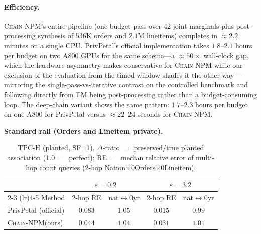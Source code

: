 \documentclass[sigconf, nonacm]{acmart}
\newcommand{\chainnpm}{\textsc{Chain-NPM}\xspace}
\begin{document}
\paragraph{Efficiency.}
\chainnpm's entire pipeline (one budget pass over $42$ joint marginals plus
post-processing synthesis of $536$K orders and $2.1$M lineitems) completes in
$\approx 2.2$ minutes on a single CPU. PrivPetal's official implementation
takes $1.8$--$2.1$ hours per budget on two A800 GPUs for the same schema---a
$\approx 50\times$ wall-clock gap, which the hardware asymmetry makes
conservative for \chainnpm{} while our exclusion of the evaluation from the
timed window shades it the other way---mirroring the single-pass-vs-iterative
contrast on the controlled benchmark and following directly from EM being
post-processing rather than a budget-consuming loop. The deep-chain variant
shows the same pattern: $1.7$--$2.3$ hours per budget on one A800 for
PrivPetal versus $\approx 22$--$24$ seconds for \chainnpm.
\label{app:tpch-deep}

\textbf{Standard rail (Orders and Lineitem private).}
\begin{table}[t]
\centering
\caption{TPC-H (planted, SF=1). $\Delta$-ratio $=$ preserved/true
planted association (1.0 $=$ perfect); RE $=$ median relative error of
multi-hop count queries (2-hop
Nation$\times$\penalty0Orders$\times$\penalty0Lineitem).}
\label{tab:tpch}
\small
\begin{tabular}{@{}lcccc@{}}
\toprule
 & \multicolumn{2}{c}{$\varepsilon{=}0.2$} & \multicolumn{2}{c}{$\varepsilon{=}3.2$} \\
\cmidrule(lr){2-3} \cmidrule(lr){4-5}
Method & 2-hop RE & nat\penalty0$\leftrightarrow$\penalty0yr & 2-hop RE & nat\penalty0$\leftrightarrow$\penalty0yr \\
\midrule
PrivPetal (official) & $0.083$ & $1.05$ & $0.015$ & $0.99$ \\
\chainnpm (ours) & $0.044$ & $1.04$ & $0.031$ & $1.01$ \\
\bottomrule
\end{tabular}
\end{table}
\end{document}
